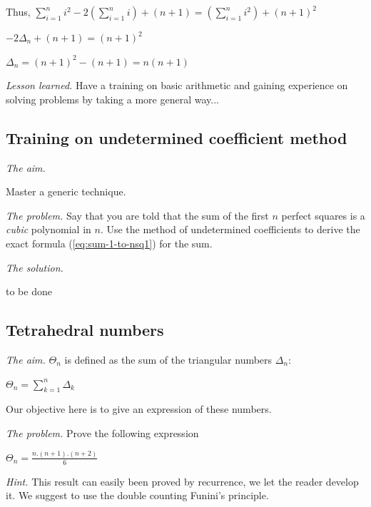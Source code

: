 Thus, 
$\sum_{i=1}^{n} i^2- 2 ( \sum_{i=1}^{n} i) + (n+1) = (\sum_{i=1}^{n} i^2) + (n+1)^2$

$-2 \Delta_n + (n+1) =  (n+1)^2$

$\Delta_n =  (n+1)^2-(n+1) = n(n+1)$
\medskip

\noindent \textit{Lesson learned.}
Have a training on basic arithmetic and gaining experience on solving problems 
by taking a more general way...


\subsection{Training on undetermined coefficient method}

\noindent \textit{The aim.}

Master a generic technique.
\medskip

\noindent \textit{The problem.}
Say that you are told that the sum of the first $n$ perfect squares is
a {\em cubic} polynomial in $n$.  Use the method of undetermined
coefficients to derive the exact formula (\ref{eq:sum-1-to-nsq1}) for
the sum.
\medskip

\noindent \textit{The solution.}

to be done


\subsection{Tetrahedral numbers}

\noindent \textit{The aim.}
$\Theta_n$ is defined as the sum of the triangular numbers $\Delta_n$:

$\Theta_n =  \sum_{k=1}^{n} \Delta_k$

Our objective here is to give an expression of these numbers.
\medskip

\noindent \textit{The problem.}
Prove the following expression

$\Theta_n = \frac{n.(n+1).(n+2)}{6}$
\medskip

\noindent \textit{Hint.}
This result can easily been proved by recurrence, we let the reader develop it. 
We suggest to use the double counting Funini's principle.

